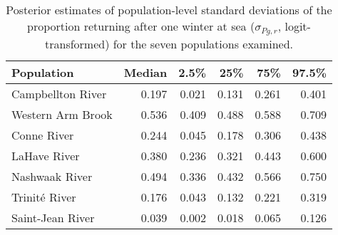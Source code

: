 \begin{table}[ht]
\centering
\caption{Posterior estimates of population-level
                    standard deviations of the proportion returning 
                    after one winter at sea 
                    ($\sigma_{Pg,r}$, logit-transformed) for the seven populations examined.} 
\label{tab:prsigma}
\begin{tabular}{lrrrrr}
  \hline
Population & Median & 2.5\% & 25\% & 75\% & 97.5\% \\ 
  \hline
Campbellton River & 0.197 & 0.021 & 0.131 & 0.261 & 0.401 \\ 
  Western Arm Brook & 0.536 & 0.409 & 0.488 & 0.588 & 0.709 \\ 
  Conne River & 0.244 & 0.045 & 0.178 & 0.306 & 0.438 \\ 
  LaHave River & 0.380 & 0.236 & 0.321 & 0.443 & 0.600 \\ 
  Nashwaak River & 0.494 & 0.336 & 0.432 & 0.566 & 0.750 \\ 
  Trinité River & 0.176 & 0.043 & 0.132 & 0.221 & 0.319 \\ 
  Saint-Jean River & 0.039 & 0.002 & 0.018 & 0.065 & 0.126 \\ 
   \hline
\end{tabular}
\end{table}
